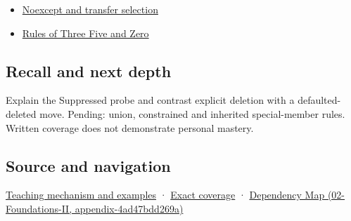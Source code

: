 \begin{itemize}
\tightlist
\item
  \hyperref[appendix-c746afaa47d1]{Noexcept and transfer selection}
\item
  \hyperref[appendix-7679107d057e]{Rules of Three Five and Zero}
\end{itemize}

\subsection{Recall and next depth}\label{appendix-42e02a12c694-recall-and-next-depth}

Explain the Suppressed probe and contrast explicit deletion with a defaulted-deleted move. Pending: union, constrained and inherited special-member rules. Written coverage does not demonstrate personal mastery.

\subsection{Source and navigation}\label{appendix-42e02a12c694-source-and-navigation}

\hyperref[01-foundations-i-ch003-let-the-compiler-compose-the-operations]{Teaching mechanism and examples} · \hyperref[appendix-fd090d982a15-m009---parts-127-147]{Exact coverage} · \href{../02-Foundations-II/main.pdf\#nameddest=appendix-4ad47bdd269a}{Dependency Map (02-Foundations-II, appendix-4ad47bdd269a)}
